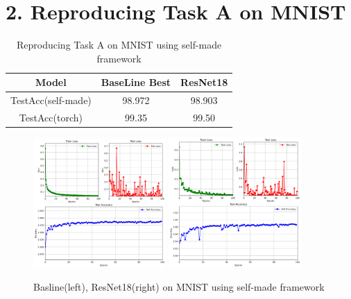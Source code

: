 \documentclass{article}
\newcommand{\secs}[1]{\section*{#1}}
\begin{document}
\secs{2. Reproducing Task A on MNIST}



\begin{table}[htbp]
  \centering
  \caption{Reproducing Task A on MNIST using self-made framework}
  \label{tab:model-compare}
  \begin{tabular}{|c|cc|} 
    \hline
    Model & BaseLine Best & ResNet18   \\
    \hline
    TestAcc(self-made) & 98.972 & 98.903  \\
    TestAcc(torch) & 99.35 & 99.50  \\
    \hline
  \end{tabular} 
\end{table}

\begin{figure}[H]
  \centering
  \includegraphics[width=0.45\textwidth]{fig/train_result_dezero_bsln.png} %
  \includegraphics[width=0.45\textwidth]{fig/train_result_dezero_res18.png} %
  \caption{Basline(left), ResNet18(right) on MNIST using self-made framework} %
  \label{fig:curve} %
\end{figure}
\end{document}

